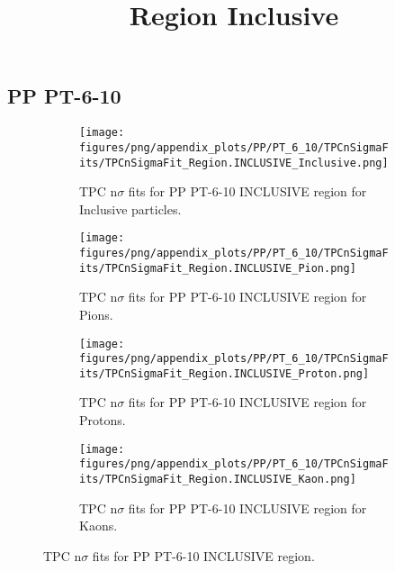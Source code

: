             \subsection{PP PT-6-10}
            \begin{figure}[H]
                \title{Region Inclusive}
                \begin{subfigure}[b]{0.5\textwidth}
                    \centering
                    \texttt{[image: figures/png/appendix\_plots/PP/PT\_6\_10/TPCnSigmaFits/TPCnSigmaFit\_Region.INCLUSIVE\_Inclusive.png]}
                    \caption{TPC n$\sigma$ fits for PP PT-6-10 INCLUSIVE region for Inclusive particles.}
                    \label{fig:appendix_PP_PT-6-10_INCLUSIVE_Inclusive}
                \end{subfigure}
                \begin{subfigure}[b]{0.5\textwidth}
                    \centering
                    \texttt{[image: figures/png/appendix\_plots/PP/PT\_6\_10/TPCnSigmaFits/TPCnSigmaFit\_Region.INCLUSIVE\_Pion.png]}
                    \caption{TPC n$\sigma$ fits for PP PT-6-10 INCLUSIVE region for Pions.}
                    \label{fig:appendix_PP_PT-6-10_INCLUSIVE_Pion}
                \end{subfigure}
                \begin{subfigure}[b]{0.5\textwidth}
                    \centering
                    \texttt{[image: figures/png/appendix\_plots/PP/PT\_6\_10/TPCnSigmaFits/TPCnSigmaFit\_Region.INCLUSIVE\_Proton.png]}
                    \caption{TPC n$\sigma$ fits for PP PT-6-10 INCLUSIVE region for Protons.}
                    \label{fig:appendix_PP_PT-6-10_INCLUSIVE_Proton}
                \end{subfigure}
                \begin{subfigure}[b]{0.5\textwidth}
                    \centering
                    \texttt{[image: figures/png/appendix\_plots/PP/PT\_6\_10/TPCnSigmaFits/TPCnSigmaFit\_Region.INCLUSIVE\_Kaon.png]}
                    \caption{TPC n$\sigma$ fits for PP PT-6-10 INCLUSIVE region for Kaons.}
                    \label{fig:appendix_PP_PT-6-10_INCLUSIVE_Kaon}
                \end{subfigure}
                \caption{TPC n$\sigma$ fits for PP PT-6-10 INCLUSIVE region.}
                \label{fig:appendix_PP_PT-6-10_INCLUSIVE}
            \end{figure}
